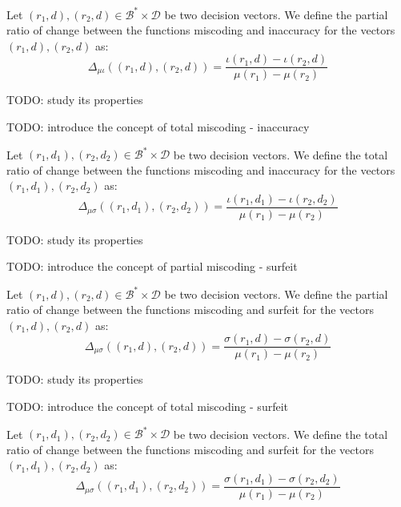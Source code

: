 \begin{definition}
Let $(r_1, d), (r_2, d) \in \mathcal{B}^\ast \times \mathcal{D}$ be two decision vectors. We define the partial ratio of change between the functions miscoding and inaccuracy for the vectors $(r_1, d), (r_2, d)$ as:
\[
\Delta_{\mu \iota} \left( (r_1, d), (r_2, d) \right) = \frac{ \iota(r_1, d) - \iota(r_2, d) }{ \mu(r_1) - \mu(r_2) }
\] 
\end{definition}

{\color{red} TODO: study its properties}

{\color{red} TODO: introduce the concept of total miscoding - inaccuracy}

\begin{definition}
Let $(r_1, d_1), (r_2, d_2) \in \mathcal{B}^\ast \times \mathcal{D}$ be two decision vectors. We define the total ratio of change between the functions miscoding and inaccuracy for the vectors $(r_1, d_1), (r_2, d_2)$ as:
\[
\Delta_{\mu \sigma} \left( (r_1, d_1), (r_2, d_2) \right) = \frac{ \iota(r_1, d_1) - \iota(r_2, d_2) }{ \mu(r_1) - \mu(r_2) }
\] 
\end{definition}

{\color{red} TODO: study its properties}

{\color{red} TODO: introduce the concept of partial miscoding - surfeit}

\begin{definition}
Let $(r_1, d), (r_2, d) \in \mathcal{B}^\ast \times \mathcal{D}$ be two decision vectors. We define the partial ratio of change between the functions miscoding and surfeit for the vectors $(r_1, d), (r_2, d)$ as:
\[
\Delta_{\mu \sigma} \left( (r_1, d), (r_2, d) \right) = \frac{ \sigma(r_1, d) - \sigma(r_2, d) }{ \mu(r_1) - \mu(r_2) }
\] 
\end{definition}

{\color{red} TODO: study its properties}

{\color{red} TODO: introduce the concept of total miscoding - surfeit}

\begin{definition}
Let $(r_1, d_1), (r_2, d_2) \in \mathcal{B}^\ast \times \mathcal{D}$ be two decision vectors. We define the total ratio of change between the functions miscoding and surfeit for the vectors $(r_1, d_1), (r_2, d_2)$ as:
\[
\Delta_{\mu \sigma} \left( (r_1, d_1), (r_2, d_2) \right) = \frac{ \sigma(r_1, d_1) - \sigma(r_2, d_2) }{ \mu(r_1) - \mu(r_2) }
\] 
\end{definition}

